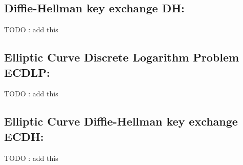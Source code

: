 \documentclass[bp,en]{FEIstyle}
\begin{document}
\subsection*{Diffie-Hellman key exchange DH:}

TODO : add this 


\subsection*{Elliptic Curve Discrete Logarithm Problem ECDLP:}

TODO : add this 

\subsection*{Elliptic Curve Diffie-Hellman key exchange ECDH:}

TODO : add this 


\newpage


\end{document}
